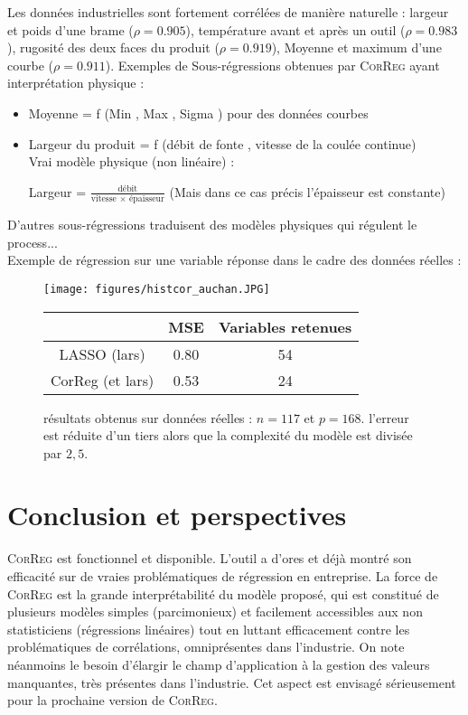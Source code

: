 \documentclass[12pt]{article}
\begin{document}
Les données industrielles sont fortement corrélées de manière naturelle : largeur et poids d'une brame ($\rho=0.905$), température avant et après un outil ($\rho=0.983$), rugosité des deux faces du produit ($\rho=0.919$), Moyenne et maximum d'une courbe ($\rho=0.911$).
Exemples de Sous-régressions obtenues par \textsc{CorReg} ayant interprétation physique :
\begin{itemize}
	\item Moyenne = f (Min , Max , Sigma ) pour des données courbes
	\item Largeur du produit = f (débit de fonte , vitesse de la coulée continue)	\\
Vrai modèle physique (non linéaire) :

	 Largeur = $\frac{\textrm{débit}}{\textrm{vitesse } \times \textrm{ épaisseur}}$ (Mais dans ce cas précis l'épaisseur est constante)
			\end{itemize}
			
			D'autres sous-régressions traduisent des modèles physiques qui régulent le process...
\\

Exemple de régression sur une variable réponse dans le cadre des données réelles :
\begin{figure}[!h]
	\begin{minipage}[c]{.40\linewidth}
			\texttt{[image: figures/histcor\_auchan.JPG]} 
	\end{minipage} \hfill
   \begin{minipage}[c]{.52\linewidth}
		\begin{tabular}{|c|c|c|}
		\hline 
		  & MSE  & Variables retenues  \\ 
		\hline
		LASSO (lars) & 0.80 & 54 \\ 
		\hline 
		CorReg (et lars) & 0.53 & 24  \\ 
		\hline 
		\end{tabular} 
   \end{minipage}
   \caption{résultats obtenus sur données réelles : $n=117$ et $p=168$. l'erreur est réduite d'un tiers alors que la complexité du modèle est divisée par $2,5$.   }
\end{figure}   
	

\section{Conclusion et perspectives}
	\textsc{CorReg} est fonctionnel et disponible. L'outil a d'ores et déjà montré son efficacité sur de vraies problématiques de régression en entreprise.
	La force de \textsc{CorReg} est la grande interprétabilité du modèle proposé, qui est constitué de plusieurs modèles simples (parcimonieux) et facilement accessibles aux non statisticiens (régressions linéaires) tout en luttant efficacement contre les problématiques de corrélations, omniprésentes dans l'industrie.
	On note néanmoins le besoin d'élargir le champ d'application à la gestion des valeurs manquantes, très présentes dans l'industrie. Cet aspect est envisagé sérieusement pour la prochaine version de \textsc{CorReg}.
	
\end{document}
